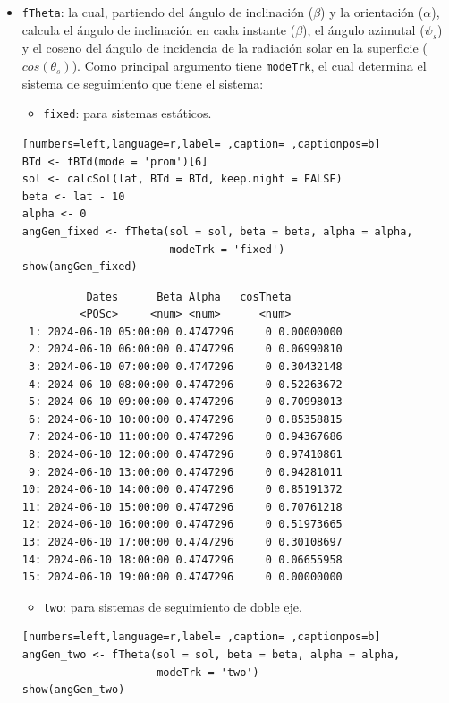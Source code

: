 \begin{itemize}
\item \texttt{fTheta}: la cual, partiendo del ángulo de inclinación (\(\beta\)) y la orientación (\(\alpha\)), calcula el ángulo de inclinación en cada instante (\(\beta\)), el ángulo azimutal (\(\psi_s\)) y el coseno del ángulo de incidencia  de la radiación solar en la superficie (\(cos(\theta_s)\)).
Como principal argumento tiene \texttt{modeTrk}, el cual determina el sistema de seguimiento que tiene el sistema:
\begin{itemize}
\item \texttt{fixed}: para sistemas estáticos.
\end{itemize}
\begin{lstlisting}[numbers=left,language=r,label= ,caption= ,captionpos=b]
BTd <- fBTd(mode = 'prom')[6] 
sol <- calcSol(lat, BTd = BTd, keep.night = FALSE)
beta <- lat - 10
alpha <- 0
angGen_fixed <- fTheta(sol = sol, beta = beta, alpha = alpha,
                       modeTrk = 'fixed')
show(angGen_fixed)
\end{lstlisting}

\begin{verbatim}
		  Dates      Beta Alpha   cosTheta
		 <POSc>     <num> <num>      <num>
 1: 2024-06-10 05:00:00 0.4747296     0 0.00000000
 2: 2024-06-10 06:00:00 0.4747296     0 0.06990810
 3: 2024-06-10 07:00:00 0.4747296     0 0.30432148
 4: 2024-06-10 08:00:00 0.4747296     0 0.52263672
 5: 2024-06-10 09:00:00 0.4747296     0 0.70998013
 6: 2024-06-10 10:00:00 0.4747296     0 0.85358815
 7: 2024-06-10 11:00:00 0.4747296     0 0.94367686
 8: 2024-06-10 12:00:00 0.4747296     0 0.97410861
 9: 2024-06-10 13:00:00 0.4747296     0 0.94281011
10: 2024-06-10 14:00:00 0.4747296     0 0.85191372
11: 2024-06-10 15:00:00 0.4747296     0 0.70761218
12: 2024-06-10 16:00:00 0.4747296     0 0.51973665
13: 2024-06-10 17:00:00 0.4747296     0 0.30108697
14: 2024-06-10 18:00:00 0.4747296     0 0.06655958
15: 2024-06-10 19:00:00 0.4747296     0 0.00000000
\end{verbatim}

\begin{itemize}
\item \texttt{two}: para sistemas de seguimiento de doble eje.
\end{itemize}
\begin{lstlisting}[numbers=left,language=r,label= ,caption= ,captionpos=b]
angGen_two <- fTheta(sol = sol, beta = beta, alpha = alpha,
                     modeTrk = 'two')
show(angGen_two)
\end{lstlisting}


\end{itemize}

